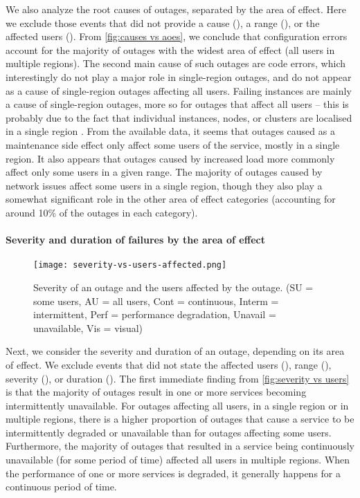 We also analyze the root causes of outages, separated by the area of effect.
Here we exclude those events that did not provide a cause (), a range (), or the affected users ().
From \autoref{fig:causes vs aoes}, we conclude that configuration errors account for the majority of outages with the widest area of effect (all users in multiple regions).
The second main cause of such outages are code errors, which interestingly do not play a major role in single-region outages, and do not appear as a cause of single-region outages affecting all users.
Failing instances are mainly a cause of single-region outages, more so for outages that affect all users -- this is probably due to the fact that individual instances, nodes, or clusters are localised in a single region \cite{awsRegionDocs}.
From the available data, it seems that outages caused as a maintenance side effect only affect some users of the service, mostly in a single region.
It also appears that outages caused by increased load more commonly affect only some users in a given range.
The majority of outages caused by network issues affect some users in a single region, though they also play a somewhat significant role in the other area of effect categories (accounting for around 10\% of the outages in each category).

\paragraph{Severity and duration of failures by the area of effect}
\begin{figure}
  \centering
  \texttt{[image: severity-vs-users-affected.png]}
  \caption{Severity of an outage and the users affected by the outage. (SU = some users, AU = all users, Cont = continuous, Interm = intermittent, Perf = performance degradation, Unavail = unavailable, Vis = visual)}
  \label{fig:severity vs users}
\end{figure}

Next, we consider the severity and duration of an outage, depending on its area of effect.
We exclude events that did not state the affected users (), range (), severity (), or duration ().
The first immediate finding from \autoref{fig:severity vs users} is that the majority of outages result in one or more services becoming intermittently unavailable.
For outages affecting all users, in a single region or in multiple regions, there is a higher proportion of outages that cause a service to be intermittently degraded or unavailable than for outages affecting some users.
Furthermore, the majority of outages that resulted in a service being continuously unavailable (for some period of time) affected all users in multiple regions.
When the performance of one or more services is degraded, it generally happens for a continuous period of time.

